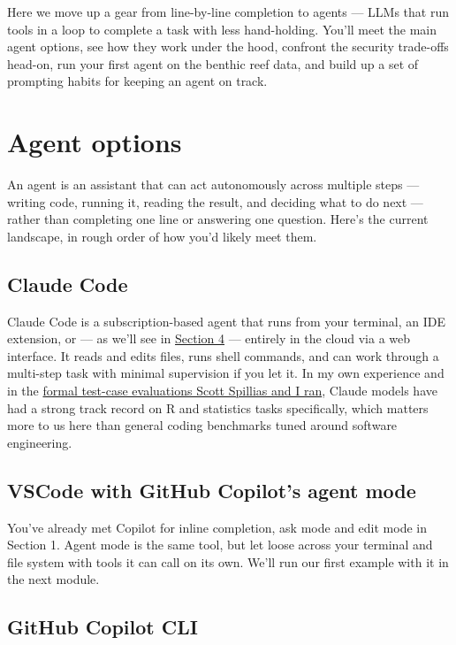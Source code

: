 \documentclass[
  letterpaper,
  DIV=11,
  numbers=noendperiod]{scrreprt}
\begin{document}
Here we move up a gear from line-by-line completion to agents --- LLMs
that run tools in a loop to complete a task with less hand-holding.
You'll meet the main agent options, see how they work under the hood,
confront the security trade-offs head-on, run your first agent on the
benthic reef data, and build up a set of prompting habits for keeping an
agent on track.

\chapter{Agent options}\label{agent-options}

An agent is an assistant that can act autonomously across multiple steps
--- writing code, running it, reading the result, and deciding what to
do next --- rather than completing one line or answering one question.
Here's the current landscape, in rough order of how you'd likely meet
them.

\section{Claude Code}\label{claude-code}

Claude Code is a subscription-based agent that runs from your terminal,
an IDE extension, or --- as we'll see in
\href{../section-4-security-privacy/02-claude-code-web-example.qmd}{Section
4} --- entirely in the cloud via a web interface. It reads and edits
files, runs shell commands, and can work through a multi-step task with
minimal supervision if you let it. In my own experience and in the
\href{https://onlinelibrary.wiley.com/doi/full/10.1111/faf.70079}{formal
test-case evaluations Scott Spillias and I ran}, Claude models have had
a strong track record on R and statistics tasks specifically, which
matters more to us here than general coding benchmarks tuned around
software engineering.

\section{VSCode with GitHub Copilot's agent
mode}\label{vscode-with-github-copilots-agent-mode}

You've already met Copilot for inline completion, ask mode and edit mode
in Section 1. Agent mode is the same tool, but let loose across your
terminal and file system with tools it can call on its own. We'll run
our first example with it in the next module.

\section{GitHub Copilot CLI}\label{github-copilot-cli}
\end{document}
